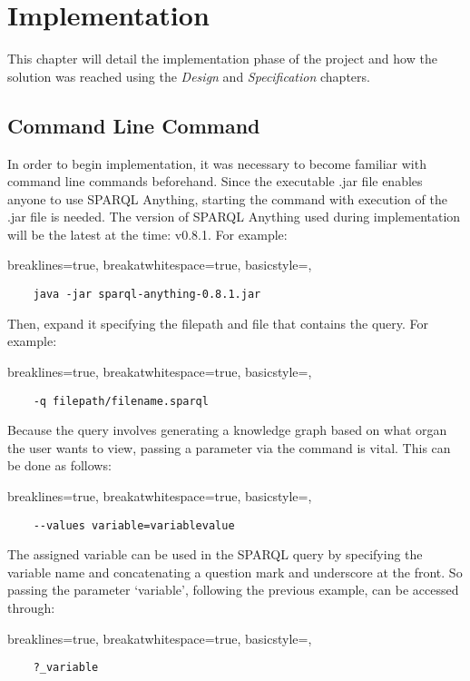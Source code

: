  \chapter{Implementation}
This chapter will detail the implementation phase of the project and how the solution was reached using the \textit{Design} and \textit{Specification} chapters. 

\section{Command Line Command}
\hspace*{0.5cm} In order to begin implementation, it was necessary to become familiar with command line commands beforehand. Since the executable .jar file enables anyone to use SPARQL Anything, starting the command with execution of the .jar file is needed. The version of SPARQL Anything used during implementation will be the latest at the time: v0.8.1. For example:

\lstset
{
    breaklines=true,
    breakatwhitespace=true,
    basicstyle=\linespread{1.5}\ttfamily,
}
\begin{lstlisting}
    java -jar sparql-anything-0.8.1.jar 
\end{lstlisting}

\noindent Then, expand it specifying the filepath and file that contains the query. For example:

\lstset
{
    breaklines=true,
    breakatwhitespace=true,
    basicstyle=\linespread{1.5}\ttfamily,
}
\begin{lstlisting}
    -q filepath/filename.sparql
\end{lstlisting}

\noindent Because the query involves generating a knowledge graph based on what organ the user wants to view, passing a parameter via the command is vital. This can be done as follows:

\lstset
{
    breaklines=true,
    breakatwhitespace=true,
    basicstyle=\linespread{1.5}\ttfamily,
}
\begin{lstlisting}
    --values variable=variablevalue
\end{lstlisting}

\noindent The assigned variable can be used in the SPARQL query by specifying the variable name and concatenating a question mark and underscore at the front. So passing the parameter `variable', following the previous example, can be accessed through:

\lstset
{
    breaklines=true,
    breakatwhitespace=true,
    basicstyle=\linespread{1.5}\ttfamily,
}
\begin{lstlisting}
    ?_variable
\end{lstlisting}

